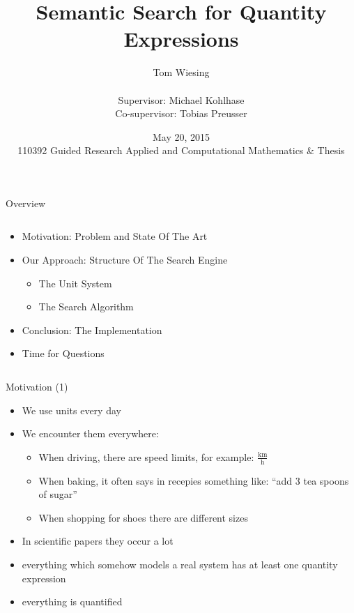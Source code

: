 \documentclass{beamer}
\title{Semantic Search for Quantity Expressions}
\author{Tom Wiesing\\\ \\Supervisor: Michael Kohlhase\\Co-supervisor: Tobias Preusser}
\date{May 20, 2015 \\110392 Guided Research Applied and Computational Mathematics \& Thesis}
\begin{document}
  \frame{\titlepage}

  \begin{frame}{Overview}
    \pause
    \begin{columns}[T]
      \begin{column}[T]{7cm}
        \begin{itemize}[<+->]
          \item Motivation: Problem and State Of The Art
          \item Our Approach: Structure Of The Search Engine
          \begin{itemize}
            \item The Unit System
            \item The Search Algorithm
          \end{itemize}
          \item Conclusion: The Implementation
          \item Time for Questions
        \end{itemize}
      \end{column}
    \end{columns}
  \end{frame}

  \begin{frame}{Motivation (1)}
    \begin{itemize}[<+->]
      \item We use units every day
      \item We encounter them everywhere:
      \begin{itemize}[<+->]
        \item When driving, there are speed limits, for example:  $\frac{\text{km}}{\text{h}}$ %
        \item When baking, it often says in recepies something like: ``add 3 tea spoons of sugar''
        \item When shopping for shoes there are different sizes
      \end{itemize}
      \item In scientific papers they occur a lot
      \item everything which somehow models a real system has at least one quantity expression
      \item everything is quantified
    \end{itemize}
  \end{frame}
\end{document}
